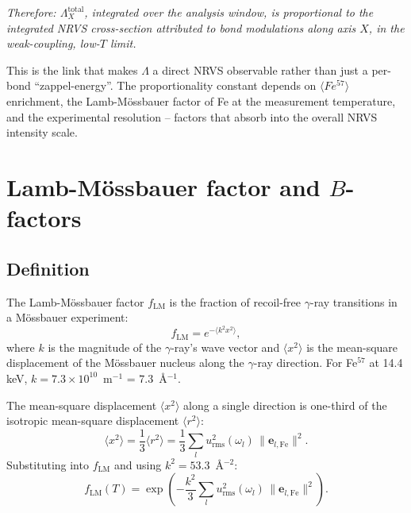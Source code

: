 \documentclass[10pt,a4paper,twoside]{article}
\newcommand{\evec}{\mathbf{e}}
\newcommand{\urms}{u_{\mathrm{rms}}}
\begin{document}
\emph{Therefore: $\Lambda_X^\text{total}$, integrated over the
analysis window, is proportional to the integrated NRVS
cross-section attributed to bond modulations along axis $X$,
in the weak-coupling, low-$T$ limit.}

This is the link that makes $\Lambda$ a direct NRVS observable
rather than just a per-bond ``zappel-energy''. The proportionality
constant depends on $\langle Fe^{57} \rangle$ enrichment, the
Lamb-Mössbauer factor of Fe at the measurement temperature, and
the experimental resolution -- factors that absorb into the
overall NRVS intensity scale.

\section{Lamb-Mössbauer factor and $B$-factors}
\label{sec:lamb-mossbauer}

\subsection{Definition}

The Lamb-Mössbauer factor $f_\text{LM}$ is the fraction of
recoil-free $\gamma$-ray transitions in a Mössbauer experiment:
\begin{equation}
  f_\text{LM} = e^{-\langle k^2 x^2 \rangle},
\end{equation}
where $k$ is the magnitude of the $\gamma$-ray's wave vector and
$\langle x^2 \rangle$ is the mean-square displacement of the
Mössbauer nucleus along the $\gamma$-ray direction. For Fe$^{57}$
at 14.4 keV, $k = 7.3 \times 10^{10}$~m$^{-1}$ = $7.3$~\AA{}$^{-1}$.

The mean-square displacement $\langle x^2 \rangle$ along a single
direction is one-third of the isotropic mean-square displacement
$\langle r^2 \rangle$:
\begin{equation}
  \langle x^2 \rangle = \frac{1}{3}\langle r^2 \rangle
                     = \frac{1}{3}\sum_l \urms^2(\omega_l)\,
                       \lVert\evec_{l,\text{Fe}}\rVert^2.
\end{equation}
Substituting into $f_\text{LM}$ and using $k^2 = 53.3$~\AA{}$^{-2}$:
\begin{equation}
  f_\text{LM}(T) = \exp\!\left(-\frac{k^2}{3}
                    \sum_l \urms^2(\omega_l)\,
                    \lVert\evec_{l,\text{Fe}}\rVert^2\right).
\end{equation}
\end{document}
